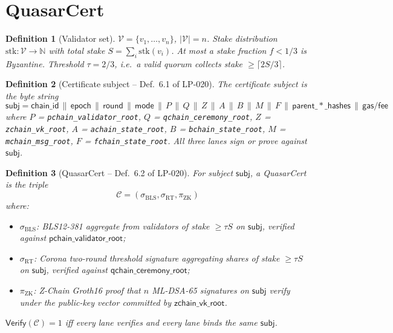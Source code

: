 \documentclass[11pt]{article}
\newtheorem{definition}{Definition}
\begin{document}
\section{QuasarCert}
\label{sec:cert}

\begin{definition}[Validator set]
\label{def:val}
$\mathcal{V} = \{v_1, \ldots, v_n\}$, $|\mathcal{V}| = n$.  Stake
distribution $\mathrm{stk}: \mathcal{V} \to \mathbb{N}$ with total
stake $S = \sum_i \mathrm{stk}(v_i)$.  At most a stake fraction $f < 1/3$
is Byzantine.  Threshold $\tau = 2/3$, i.e.\ a valid quorum collects
stake $\geq \lceil 2S/3 \rceil$.
\end{definition}

\begin{definition}[Certificate subject -- Def.~6.1 of LP-020]
\label{def:subject}
The \emph{certificate subject} is the byte string
\[
  \mathsf{subj} =
  \mathsf{chain\_id} \,\|\, \mathsf{epoch} \,\|\, \mathsf{round}
  \,\|\, \mathsf{mode}
  \,\|\, P \,\|\, Q \,\|\, Z \,\|\, A \,\|\, B \,\|\, M \,\|\, F
  \,\|\, \mathsf{parent\_*\_hashes}
  \,\|\, \mathsf{gas/fee}
\]
where $P$ = \texttt{pchain\_validator\_root}, $Q$ =
\texttt{qchain\_ceremony\_root}, $Z$ = \texttt{zchain\_vk\_root},
$A$ = \texttt{achain\_state\_root}, $B$ = \texttt{bchain\_state\_root},
$M$ = \texttt{mchain\_msg\_root}, $F$ = \texttt{fchain\_state\_root}.
All three lanes sign or prove against $\mathsf{subj}$.
\end{definition}

\begin{definition}[QuasarCert -- Def.~6.2 of LP-020]
\label{def:cert}
For subject $\mathsf{subj}$, a \emph{QuasarCert} is the triple
\[
  \mathcal{C} = (\sigma_{\mathrm{BLS}}, \sigma_{\mathrm{RT}},
                  \pi_{\mathrm{ZK}})
\]
where:
\begin{itemize}[nosep]
  \item $\sigma_{\mathrm{BLS}}$: BLS12-381 aggregate from validators of
    stake $\geq \tau S$ on $\mathsf{subj}$, verified against
    $\mathsf{pchain\_validator\_root}$;
  \item $\sigma_{\mathrm{RT}}$: Corona two-round threshold signature
    aggregating shares of stake $\geq \tau S$ on $\mathsf{subj}$,
    verified against $\mathsf{qchain\_ceremony\_root}$;
  \item $\pi_{\mathrm{ZK}}$: Z-Chain Groth16 proof that $n$ ML-DSA-65
    signatures on $\mathsf{subj}$ verify under the public-key vector
    committed by $\mathsf{zchain\_vk\_root}$.
\end{itemize}
$\mathsf{Verify}(\mathcal{C}) = 1$ iff every lane verifies and every
lane binds the \emph{same} $\mathsf{subj}$.
\end{definition}
\end{document}
